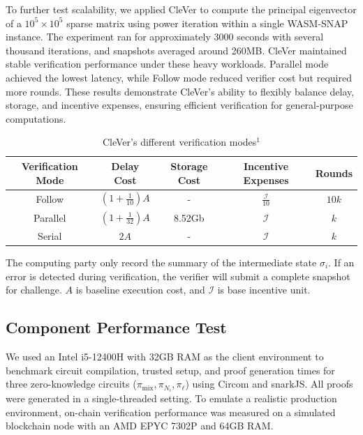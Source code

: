 \documentclass[3p]{elsarticle}
\theoremstyle{remark}
\begin{document}
To further test scalability, we applied CleVer to compute the principal eigenvector of a $10^5 \times 10^5$ sparse matrix using power iteration within a single WASM-SNAP instance. The experiment ran for approximately 3000 seconds with several thousand iterations, and snapshots averaged around 260MB. CleVer maintained stable verification performance under these heavy workloads. Parallel mode achieved the lowest latency, while Follow mode reduced verifier cost but required more rounds. These results demonstrate CleVer’s ability to flexibly balance delay, storage, and incentive expenses, ensuring efficient verification for general-purpose computations.


\begin{table}[h]
\centering
\caption{CleVer's different verification modes$^1$}\label{vermodel}
\begin{tabular}{ccccc}
\toprule
\textbf{Verification Mode} & \textbf{Delay Cost} & \textbf{Storage Cost} & \textbf{Incentive Expenses} & \textbf{Rounds} \\
\midrule
Follow & $(1+ \frac{1}{10})A$ & - & $\frac{\mathcal{I}}{10}$ & $10k$ \\
Parallel & $(1+\frac{1}{32})A$ & 8.52Gb & $\mathcal{I}$ & $k$ \\
Serial & $2A$ & - & $\mathcal{I}$ & $k$ \\
\bottomrule
\end{tabular}

\begin{threeparttable}
\begin{tablenotes}
\footnotesize
\item[1] The computing party only record the summary of the intermediate state $\sigma_i$. If an error is detected during verification, the verifier will submit a complete snapshot for challenge. $A$ is baseline execution cost, and $\mathcal{I}$ is base incentive unit.
\end{tablenotes}
\end{threeparttable}

\vspace{-0.5em}
\end{table}


\subsection{Component Performance Test}

We used an Intel i5-12400H with 32GB RAM as the client environment to benchmark circuit compilation, trusted setup, and proof generation times for three zero-knowledge circuits ($\pi_{\text{mix}}, \pi_{N_i}, \pi_\ell$) using Circom and snarkJS. All proofs were generated in a single-threaded setting. To emulate a realistic production environment, on-chain verification performance was measured on a simulated blockchain node with an AMD EPYC 7302P and 64GB RAM.
\end{document}
